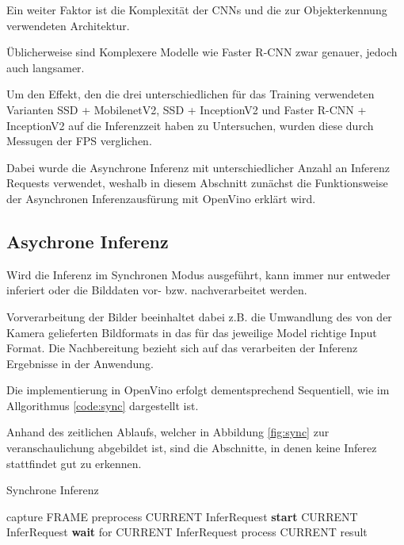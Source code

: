 Ein weiter Faktor ist die Komplexität der CNNs und die zur 
Objekterkennung verwendeten Architektur.

Üblicherweise sind Komplexere Modelle wie Faster R-CNN zwar genauer, 
jedoch auch langsamer.

Um den Effekt, den die drei unterschiedlichen 
für das Training verwendeten Varianten SSD + MobilenetV2, 
SSD + InceptionV2 und Faster R-CNN + InceptionV2 auf die Inferenzzeit
haben zu Untersuchen, wurden diese durch Messugen der FPS 
verglichen.

Dabei wurde die Asynchrone Inferenz mit unterschiedlicher Anzahl 
an Inferenz Requests verwendet, weshalb in diesem Abschnitt 
zunächst die Funktionsweise der Asynchronen Inferenzausfürung 
mit OpenVino erklärt wird.


\subsection{Asychrone Inferenz}

Wird die Inferenz im Synchronen Modus ausgeführt, kann immer
nur entweder inferiert oder 
die Bilddaten vor- bzw. nachverarbeitet werden.

Vorverarbeitung der Bilder beeinhaltet dabei 
z.B. die Umwandlung des von der Kamera gelieferten 
Bildformats in das für das jeweilige Model richtige 
Input Format.
Die Nachbereitung bezieht sich auf das verarbeiten 
der Inferenz Ergebnisse in der Anwendung.


Die implementierung in OpenVino 
erfolgt dementsprechend Sequentiell, wie 
im Allgorithmus \ref{code:sync} dargestellt ist.


Anhand des zeitlichen Ablaufs, welcher in Abbildung \ref{fig:sync}
zur veranschaulichung abgebildet ist, sind die Abschnitte, 
in denen keine Inferez stattfindet gut zu erkennen.


\vspace{1cm}
\begin{minipage}{0.1\textwidth}
  \hfill
\end{minipage}
\begin{minipage}{0.5\textwidth}
  \begin{algorithm}[H]
    \caption{Synchrone Inferenz}
    \label{code:sync}
    \begin{algorithmic}
    \WHILE{\TRUE}
        \STATE capture FRAME
        \STATE preprocess CURRENT InferRequest
        \STATE \textbf{start} CURRENT InferRequest
        \STATE \textbf{wait} for CURRENT InferRequest
        \STATE process CURRENT result
    \ENDWHILE
    \end{algorithmic}
  \end{algorithm}  
\end{minipage}
\begin{minipage}{0.4\textwidth}
  \centering
  \vspace{1cm}
  \def\svgwidth{0.5\textwidth}
  
\end{minipage}

